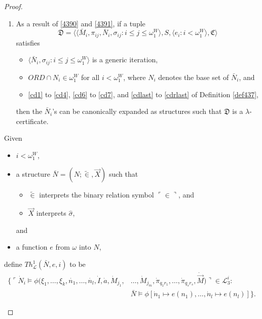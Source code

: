 \documentclass[12pt]{article}
\numberwithin{equation}{section}
\begin{document}
\begin{proof}
\begin{rem}
\begin{enumerate}[label=(\arabic*)]
    \item\label{4392} As a result of \ref{4390} and \ref{4391}, if a tuple
    \begin{equation*}
        \mathfrak{D} = \langle \langle \bar{M}_i, \pi_{ij},  \bar{N}_i, \sigma_{ij} : i \leq j \leq \omega_1^{W} \rangle, S, \langle e_i : i < \omega_1^W \rangle, \mathfrak{C} \rangle
    \end{equation*}
    satisfies 
    \begin{itemize}
        \item $\langle \bar{N}_i, \sigma_{ij} : i \leq  j \leq \omega_1^{W} \rangle$ is a generic iteration, 
        \item $ORD \cap N_i \in \omega_1^W$ for all $i < \omega_1^W$, where $N_i$ denotes the base set of $\bar{N}_i$, and
        \item \ref{cd1} to \ref{cd4}, \ref{cd6} to \ref{cd7}, and \ref{cdlast} to \ref{cdrlast} of Definition \ref{def437},
    \end{itemize}
    then the $\bar{N}_i$'s can be canonically expanded as structures such that $\mathfrak{D}$ is a $\lambda$-certificate.
\end{enumerate}

\end{rem}

\begin{defi}
Given
\begin{itemize}
    \item $i < \omega_1^W$,
    \item a structure $\bar{N} = (N; \tilde{\in}, \Vec{X})$ such that
    \begin{itemize}[label=$\circ$]
        \item $\tilde{\in}$ interprets the binary relation symbol $\ulcorner \in \urcorner$, and
        \item $\Vec{X}$ interprets $\hat{\sigma}$,
    \end{itemize}
    and
    \item a function $e$ from $\omega$ into $N$, 
\end{itemize} 
define $Th^{1}_{\mathcal{L}}(\bar{N}, e, i)$ to be 
\begin{align*}
    \{\ulcorner \dot{N}_i \models \phi(\xi_1, \ldots, \xi_k, \dot{n_1}, \ldots, \dot{n_l}, \dot{I}, \dot{a}, \dot{M}_{j_1}, & \ldots, \dot{M}_{j_m}, \dot{\pi}_{q_{1}r_{1}}, \ldots, \dot{\pi}_{q_{s}r_{s}}, \dot{\Vec{M}}) \urcorner \in \mathcal{L}^i_3 : \\ & \bar{N} \models \phi[\dot{n}_1 \mapsto e(n_1), \ldots, \dot{n}_l \mapsto e(n_l)]\}.
\end{align*}
\end{defi}


\end{proof}
\end{document}
